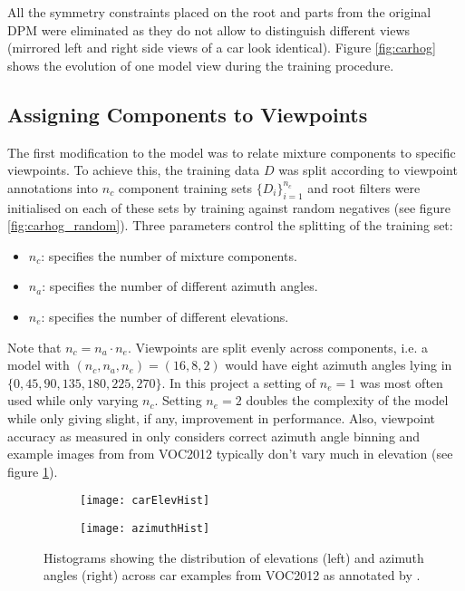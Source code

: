 All the symmetry constraints placed on the root and parts from the original DPM \cite{5255236} were eliminated as they do not allow to distinguish different views (mirrored left and right side views of a car look identical). Figure \ref{fig:carhog} shows the evolution of one model view during the training procedure.


\subsection{Assigning Components to Viewpoints}
The first modification to the model was to relate mixture components to specific viewpoints. To achieve this, the training data $D$ was split according to viewpoint annotations into $n_c$ component training sets $\{D_i\}_{i=1}^{n_c}$ and root filters were initialised on each of these sets by training against random negatives (see figure \ref{fig:carhog_random}). Three parameters control the splitting of the training set: 
\begin{itemize}
  \item $n_c$: specifies the number of mixture components.
  \item $n_a$: specifies the number of different azimuth angles.
  \item $n_e$: specifies the number of different elevations. 
\end{itemize}
Note that $n_c=n_a\cdot n_e$. Viewpoints are split evenly across components, i.e. a model with $(n_c, n_a, n_e)=(16,8,2)$ would have eight azimuth angles lying in $\{0,45,90,135,180,225,270\}$. In this project a setting of $n_e=1$ was most often used while only varying $n_c$. Setting $n_e=2$ doubles the complexity of the model while only giving slight, if any, improvement in performance. Also, viewpoint accuracy as measured in  \cite{xiang_wacv14} only considers correct azimuth angle binning and example images from from VOC2012 \cite{pascal-voc-2012} typically don't vary much in elevation (see figure \ref{fig:hist}).

\begin{figure}
\begin{center}
        \begin{subfigure}[b]{0.49\textwidth}
                \texttt{[image: carElevHist]}
        \end{subfigure}
        \begin{subfigure}[b]{0.49\textwidth}
                \texttt{[image: azimuthHist]}
        \end{subfigure}
\caption{Histograms showing the distribution of elevations (left) and azimuth angles (right) across car examples from VOC2012 as annotated by \cite{xiang_wacv14}.}\label{fig:hist}
\end{center}
\end{figure}


